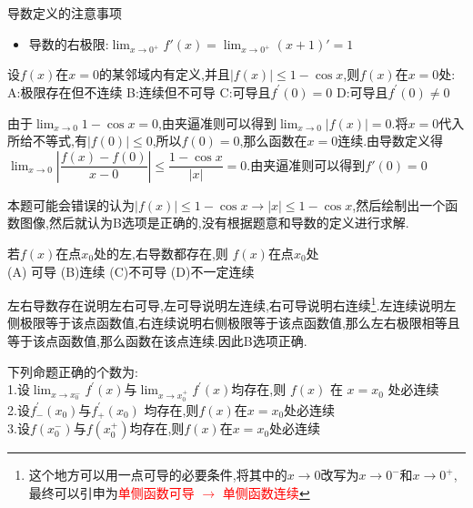 \documentclass[8pt a4paper, oneside, UTF8]{ctexbook}  %
\begin{document}
\begin{sloppypar}
\begin{criterion}{导数定义的注意事项}{}
\begin{enumerate}
\begin{itemize}
                      \item 导数的右极限:$\lim_{x \to 0^+}f'(x)=\lim_{x\to 0^+}(x+1)' = 1$
                  \end{itemize}
        \end{enumerate}
    \end{criterion}
    \begin{problem}
    设$f(x)$在$x=0$的某邻域内有定义,并且$|f(x)|\leqslant1-\cos x$,则$f(x)$在$x=0$处:\\
    A:极限存在但不连续 \quad B:连续但不可导 \quad C:可导且$f^\prime(0)=0$ \quad D:可导且$f^\prime(0)\neq0$
    \end{problem}
    \begin{solution}
        由于$\lim_{x\to 0}1-\cos x=0$,由夹逼准则可以得到$\lim_{x\to 0}|f(x)|=0.$将$x=0$代入所给不等式,有$|f(0)|\leqslant 0$,所以$f(0)=0$,那么函数在$x=0$连续.由导数定义得$\lim_{x\to 0}\left|\dfrac{f(x)-f(0)}{x-0}\right|\leqslant \dfrac{1-\cos x}{|x|}=0$.由夹逼准则可以得到$f'(0)=0$
    \end{solution}
    \begin{note}
        本题可能会错误的认为$|f(x)|\leqslant 1-\cos x \to |x|\leqslant 1-\cos x$,然后绘制出一个函数图像,然后就认为B选项是正确的,没有根据题意和导数的定义进行求解.
    \end{note}
    \begin{problem}
    若$f(x)$在点$x_{0}$处的左,右导数都存在,则 $f(x)$在点$x_{0}$处\\
    (A) 可导 \quad (B)连续 \quad  (C)不可导 \quad (D)不一定连续
    \end{problem}
    \begin{solution}
        左右导数存在说明左右可导,左可导说明左连续,右可导说明右连续\footnote{这个地方可以用一点可导的必要条件,将其中的$x \to 0$改写为$x \to 0^-$和$x \to 0^+$,最终可以引申为\textcolor{red}{单侧函数可导 $\to$ 单侧函数连续}}.左连续说明左侧极限等于该点函数值,右连续说明右侧极限等于该点函数值,那么左右极限相等且等于该点函数值,那么函数在该点连续.因此B选项正确.
    \end{solution}
    \begin{problem}
    下列命题正确的个数为:\\
    1.设$\lim_{x\to x_0^-}f^{\prime}(x)$与$\lim_{x\to x_0^+}f^{\prime}(x)$均存在,则 $f(x)$ 在 $x=x_0$ 处必连续\\
    2.设$f^{\prime}_-(x_{0})$与$f^{\prime}_{+}(x_{0})$ 均存在,则$f(x)$在$x=x_{0}$处必连续\\
    3.设$f(x_{0}^{-})$与$f(x_{0}^{+})$均存在,则$f(x)$在$x=x_{0}$处必连续\\

\end{problem}
\end{sloppypar}
\end{document}

